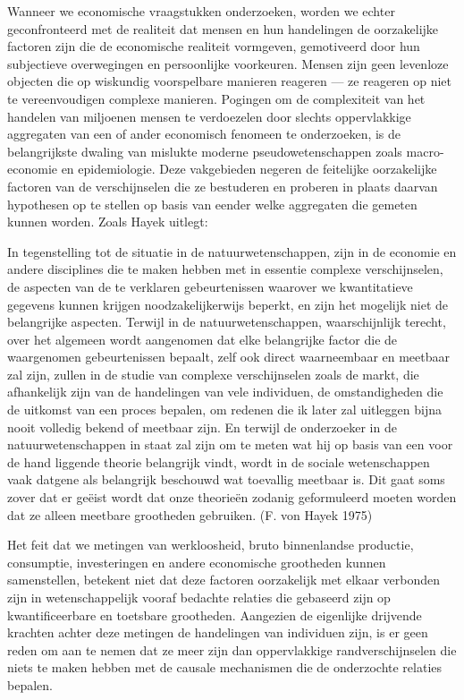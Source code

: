 \documentclass[
  a5paper,
  smalldemyvopaper,11pt,twoside,onecolumn,openright,extrafontsizes,
hidelinks]{memoir}
\begin{document}
Wanneer we economische vraagstukken onderzoeken, worden we echter
geconfronteerd met de realiteit dat mensen en hun handelingen de
oorzakelijke factoren zijn die de economische realiteit vormgeven,
gemotiveerd door hun subjectieve overwegingen en persoonlijke
voorkeuren. Mensen zijn geen levenloze objecten die op wiskundig
voorspelbare manieren reageren --- ze reageren op niet te vereenvoudigen
complexe manieren. Pogingen om de complexiteit van het handelen van
miljoenen mensen te verdoezelen door slechts oppervlakkige aggregaten
van een of ander economisch fenomeen te onderzoeken, is de belangrijkste
dwaling van mislukte moderne pseudowetenschappen zoals macro-economie en
epidemiologie. Deze vakgebieden negeren de feitelijke oorzakelijke
factoren van de verschijnselen die ze bestuderen en proberen in plaats
daarvan hypothesen op te stellen op basis van eender welke aggregaten
die gemeten kunnen worden. Zoals Hayek uitlegt:

In tegenstelling tot de situatie in de natuurwetenschappen, zijn in de
economie en andere disciplines die te maken hebben met in essentie
complexe verschijnselen, de aspecten van de te verklaren gebeurtenissen
waarover we kwantitatieve gegevens kunnen krijgen noodzakelijkerwijs
beperkt, en zijn het mogelijk niet de belangrijke aspecten. Terwijl in
de natuurwetenschappen, waarschijnlijk terecht, over het algemeen wordt
aangenomen dat elke belangrijke factor die de waargenomen gebeurtenissen
bepaalt, zelf ook direct waarneembaar en meetbaar zal zijn, zullen in de
studie van complexe verschijnselen zoals de markt, die afhankelijk zijn
van de handelingen van vele individuen, de omstandigheden die de
uitkomst van een proces bepalen, om redenen die ik later zal uitleggen
bijna nooit volledig bekend of meetbaar zijn. En terwijl de onderzoeker
in de natuurwetenschappen in staat zal zijn om te meten wat hij op basis
van een voor de hand liggende theorie belangrijk vindt, wordt in de
sociale wetenschappen vaak datgene als belangrijk beschouwd wat
toevallig meetbaar is. Dit gaat soms zover dat er geëist wordt dat onze
theorieën zodanig geformuleerd moeten worden dat ze alleen meetbare
grootheden gebruiken. (F. von Hayek 1975)

Het feit dat we metingen van werkloosheid, bruto binnenlandse productie,
consumptie, investeringen en andere economische grootheden kunnen
samenstellen, betekent niet dat deze factoren oorzakelijk met elkaar
verbonden zijn in wetenschappelijk vooraf bedachte relaties die
gebaseerd zijn op kwantificeerbare en toetsbare grootheden. Aangezien de
eigenlijke drijvende krachten achter deze metingen de handelingen van
individuen zijn, is er geen reden om aan te nemen dat ze meer zijn dan
oppervlakkige randverschijnselen die niets te maken hebben met de
causale mechanismen die de onderzochte relaties bepalen.
\end{document}
